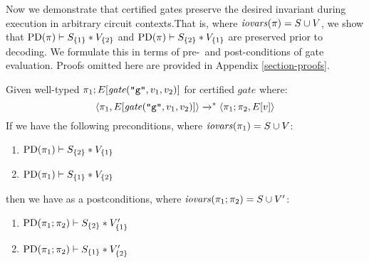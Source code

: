 Now we demonstrate that certified gates preserve the desired invariant
during execution in arbitrary circuit contexts.That is, where
$\mathit{iovars}(\pi) = S \cup V$, we show that
$\mathrm{PD}(\pi) \vdash S_{\{1\}} * V_{\{2\}}$ and
$\mathrm{PD}(\pi) \vdash S_{\{2\}} * V_{\{1\}}$ are preserved prior to
decoding.  We formulate this in terms of pre-~and post-conditions of
gate evaluation. Proofs omitted here are provided in Appendix
\ref{section-proofs}.
\begin{lemma}
  \label{lemma-gmw-preservation}
  Given well-typed $\pi_1;E[\mathit{gate}(\texttt{"g"},v_1,v_2)]$ for certified $\mathit{gate}$ where:
  $$
  \langle \pi_1,E[\mathit{gate}(\texttt{"g"},v_1,v_2)] \rangle \xrightarrow{}^{*} \langle \pi_1;\pi_2,E[v] \rangle
  $$
  If we have the following preconditions, where $\mathit{iovars}(\pi_1) = S \cup V$:
  \begin{enumerate}[\hspace{5mm}i.]
  \item $\mathrm{PD}(\pi_1) \vdash S_{\{2\}} * V_{\{1\}}$
  \item $\mathrm{PD}(\pi_1) \vdash S_{\{1\}} * V_{\{2\}}$
  \end{enumerate}
  then we have as a postconditions, where $\mathit{iovars}(\pi_1;\pi_2) = S \cup V'$:
  \begin{enumerate}[\hspace{5mm}i.]
  \item $\mathrm{PD}(\pi_1;\pi_2) \vdash S_{\{2\}} * V'_{\{1\}}$
  \item $\mathrm{PD}(\pi_1;\pi_2) \vdash S_{\{1\}} * V'_{\{2\}}$
  \end{enumerate}
\end{lemma}

